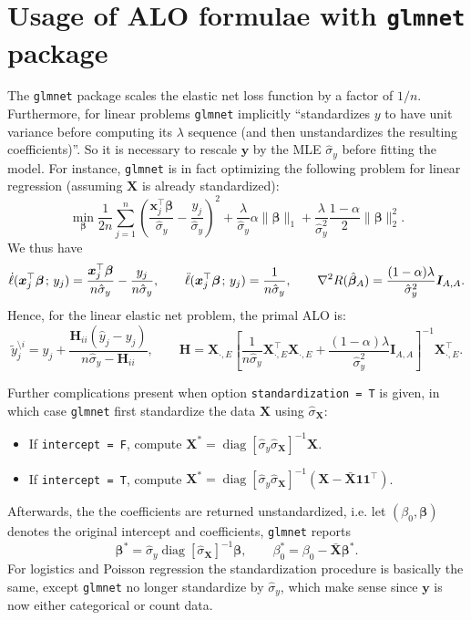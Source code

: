 \documentclass[11pt]{article}
\newcommand{\bx}{\bm{x}}
\newcommand{\by}{\bm{y}}
\newcommand{\bH}{\bm{H}}
\newcommand{\bI}{\bm{I}}
\newcommand{\bX}{\bm{X}}
\newcommand{\bbeta}{\bm{\beta}}
\newcommand{\semicol}{\nobreak\mskip2mu\mathpunct{}\nonscript\mkern-\thinmuskip{;}\mskip6muplus1mu\relax}
\DeclareMathOperator{\diag}{diag}
\begin{document}
\section{Usage of ALO formulae with \texttt{glmnet} package}
The \verb|glmnet| package scales the elastic net loss function by a factor of \(1/n\). Furthermore, for linear problems \verb|glmnet| implicitly ``standardizes \(y\) to have unit variance before computing its \(\lambda\) sequence (and then unstandardizes the resulting coefficients)''. So it is necessary to rescale \(\by\) by the MLE \(\hat{\sigma}_y\) before fitting the model. For instance, \verb|glmnet| is in fact optimizing the following problem for linear regression (assuming \(\bX\) is already standardized): 
	\begin{equation}
	\min_{\bbeta}\frac{1}{2n}\sum_{j=1}^{n}\left(\frac{\bx_j^\top\bbeta}{\hat{\sigma}_y}-\frac{y_j}{\hat{\sigma}_y}\right)^2+\frac{\lambda}{\hat{\sigma}_y}\alpha\|\bbeta\|_1+\frac{\lambda}{\hat{\sigma}^2_y}\frac{1-\alpha}{2}\|\bbeta\|_2^2.
	\end{equation}
We thus have \[\dot{\ell}(\bx_j^\top\bbeta\semicol y_j)=\frac{\bx_j^\top\bbeta}{n\hat{\sigma}_y}-\frac{y_j}{n\hat{\sigma}_y},\qquad\ddot{\ell}(\bx_j^\top\bbeta\semicol y_j)=\frac{1}{n\hat{\sigma}_y},\qquad\nabla^2 R(\hat{\bbeta}_A)=\frac{(1-\alpha)\lambda}{\hat{\sigma}_y^2}\bI_{A,A}.\] Hence, for the linear elastic net problem, the primal ALO is: \[\tilde{y}_j^{\setminus i}=\hat{y}_j+\frac{\bH_{ii}(\hat{y}_j-y_j)}{n\hat{\sigma}_y-\bH_{ii}},\qquad\bH=\bX_{\cdot,E}\left[\frac{1}{n\hat{\sigma}_y}\bX_{\cdot,E}^\top\bX_{\cdot,E}+\frac{\left(1-\alpha\right)\lambda}{\hat{\sigma}_y^2}\bI_{A,A}\right]^{-1}\bX_{\cdot,E}^\top.\]

Further complications present when option \verb|standardization = T| is given, in which case \verb|glmnet| first standardize the data \(\bX\) using \(\hat{\sigma}_{\bX}\):
	\begin{itemize}
		\item If \verb|intercept = F|, compute \(\bX^\ast=\diag[\hat{\sigma}_y\hat{\sigma}_{\bX}]^{-1}\bX\).
		\item If \verb|intercept = T|, compute \(\bX^\ast=\diag[\hat{\sigma}_y\hat{\sigma}_{\bX}]^{-1}(\bX-\bar{\bX}\bm{1}\bm{1}^\top)\).
	\end{itemize} 
Afterwards, the the coefficients are returned unstandardized, i.e. let \((\beta_0, \bbeta)\) denotes the original intercept and coefficients, \verb|glmnet| reports \[\bbeta^\ast=\hat{\sigma}_y\diag[\hat{\sigma}_{\bX}]^{-1}\bbeta,\qquad\beta_0^\ast=\beta_0-\bar{\bX}\bbeta^\ast.\] 
For logistics and Poisson regression the standardization procedure is basically the same, except \verb|glmnet| no longer standardize by \(\hat{\sigma}_y\), which make sense since \(\by\) is now either categorical or count data.
\end{document}
